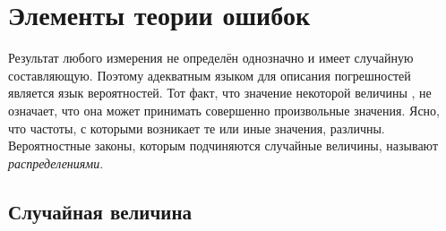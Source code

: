 \chapter{Элементы теории ошибок}
\label{ch:prob}



Результат любого измерения не определён однозначно и имеет случайную составляющую.
Поэтому адекватным языком для описания погрешностей является язык вероятностей.
Тот факт, что значение некоторой величины , не означает, что
она может принимать совершенно произвольные значения. Ясно, что частоты, с которыми
возникает те или иные значения, различны. Вероятностные законы, которым
подчиняются случайные величины, называют \emph{распределениями}.

\section{Случайная величина}



